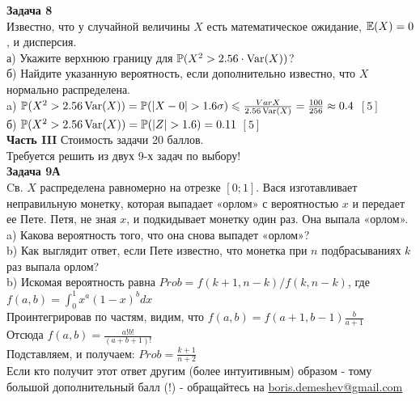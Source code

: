 \documentclass[12pt, a4paper]{article}\usepackage[]{graphicx}\usepackage[]{color}
\begin{document}
	\textbf{Задача 8} \\ %
	Известно, что у случайной величины $X$ есть
	математическое
	ожидание, $\mathbb{E}(X)=0$, и дисперсия. \\
	а) Укажите верхнюю границу для $\mathbb{P}(X^{2}>2.56\cdot \operatorname{Var}(X))$? \\%
	б) Найдите указанную вероятность, если дополнительно известно, что
	$X$ нормально распределена. \\%
	a) $\P(X^{2}>2.56\Var(X))=\P(|X-0|>1.6\sigma)\le
	\frac{Var{X}}{2.56\Var(X)}=\frac{100}{256}\approx 0.4$ $[5]$\\
	б) $\P(X^{2}>2.56\Var(X))=\P(|Z|>1.6)=0.11$ $[5]$\\

	\textbf{Часть III} Стоимость задачи 20 баллов. \\
	Требуется решить \textbf{} из двух 9-х задач по
	выбору! \\

	\textbf{Задача 9А} \\
	Cв.  $X$ распределена равномерно на отрезке $[0;1]$. Вася изготавливает неправильную монетку, которая выпадает «орлом» с вероятностью  $x$ и передает ее Пете.
	Петя, не зная $x$, и подкидывает монетку один раз. Она выпала
	«орлом». \\
	a) Какова вероятность того, что она снова выпадет
	«орлом»? \\
	b) Как выглядит ответ, если Пете известно, что монетка при
	$n$ подбрасываниях  $k$  раз выпала орлом? \\

	b) Искомая вероятность равна $Prob=f(k+1,n-k)/f(k,n-k)$, где \\
	$f(a,b)=\int_{0}^{1}x^{a}(1-x)^{b}dx$ \\
	Проинтегрировав по частям, видим, что $f(a,b)=f(a+1,b-1)\frac{b}{a+1}$ \\
	Отсюда $f(a,b)=\frac{a!b!}{(a+b+1)!}$ \\
	Подставляем, и получаем: $Prob=\frac{k+1}{n+2}$ \\
	Если кто получит этот ответ другим (более интуитивным) образом - тому большой дополнительный балл (!) - обращайтесь на \href{mailto:boris.demeshev@gmail.com}{boris.demeshev@gmail.com} \\
\end{document}
